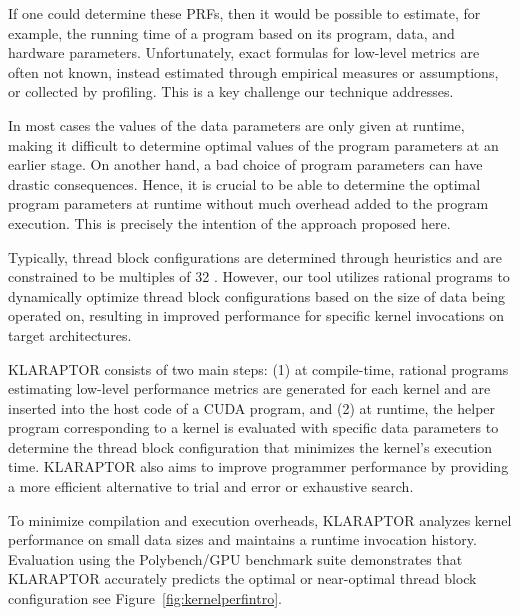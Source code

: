 If one could determine these PRFs, 
then it would be possible to estimate, for example, 
the running time of a program based on its
program, data, and hardware parameters. 
Unfortunately, exact formulas for low-level metrics are often not known, 
instead estimated through empirical measures or
assumptions, or collected by profiling.
This is a key challenge our technique addresses.
%

In most cases the values of the data parameters are only given at
runtime, making it difficult to determine optimal values of the
program parameters at an earlier stage. On another hand, a bad choice
of program parameters can have drastic consequences.  Hence, it is
crucial to be able to determine the optimal program parameters at
runtime without much overhead added to the program execution. This is
precisely the intention of the approach proposed here. %

Typically, thread block configurations are determined through heuristics 
and are constrained to be multiples of 32 \cite{cuda2016best}. However, our tool utilizes rational 
programs to dynamically optimize thread block configurations based on the size 
of data being operated on, resulting in improved performance for specific kernel 
invocations on target architectures.

KLARAPTOR consists of two main steps: (1) at compile-time, rational programs 
estimating low-level performance metrics are generated for each kernel and are 
inserted into the host code of a CUDA program, and (2) at runtime, the helper 
program corresponding to a kernel is evaluated with specific data parameters to 
determine the thread block configuration that minimizes the kernel's execution time. 
KLARAPTOR also aims to improve programmer performance by providing a more efficient 
alternative to trial and error or exhaustive search.

To minimize compilation and execution overheads, KLARAPTOR analyzes kernel performance 
on small data sizes and maintains a runtime invocation history. Evaluation using the 
Polybench/GPU benchmark suite demonstrates that KLARAPTOR accurately predicts the optimal 
or near-optimal thread block configuration see Figure~\ref{fig:kernelperfintro}.




